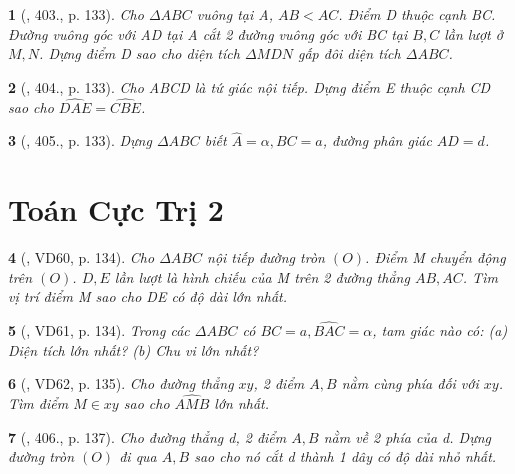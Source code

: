\documentclass{article}
\newtheorem{baitoan}{}
\begin{document}
\begin{baitoan}[\cite{Binh_Toan_9_tap_2}, 403., p. 133]
	Cho $\Delta ABC$ vuông tại A, $AB < AC$. Điểm D thuộc cạnh BC. Đường vuông góc với AD tại A cắt 2 đường vuông góc với BC tại $B,C$ lần lượt ở $M,N$. Dựng điểm D sao cho diện tích $\Delta MDN$ gấp đôi diện tích $\Delta ABC$.
\end{baitoan}

\begin{baitoan}[\cite{Binh_Toan_9_tap_2}, 404., p. 133]
	Cho ABCD là tứ giác nội tiếp. Dựng điểm E thuộc cạnh CD sao cho $\widehat{DAE} = \widehat{CBE}$.
\end{baitoan}

\begin{baitoan}[\cite{Binh_Toan_9_tap_2}, 405., p. 133]
	Dựng $\Delta ABC$ biết $\widehat{A} = \alpha,BC = a$, đường phân giác $AD = d$.
\end{baitoan}


\section{Toán Cực Trị 2}

\begin{baitoan}[\cite{Binh_Toan_9_tap_2}, VD60, p. 134]
	Cho $\Delta ABC$ nội tiếp đường tròn $(O)$. Điểm M chuyển động trên $(O)$. $D,E$ lần lượt là hình chiếu của M trên 2 đường thẳng $AB,AC$. Tìm vị trí điểm M sao cho DE có độ dài lớn nhất.
\end{baitoan}

\begin{baitoan}[\cite{Binh_Toan_9_tap_2}, VD61, p. 134]
	Trong các $\Delta ABC$ có $BC = a,\widehat{BAC} = \alpha$, tam giác nào có: (a) Diện tích lớn nhất? (b) Chu vi lớn nhất?
\end{baitoan}

\begin{baitoan}[\cite{Binh_Toan_9_tap_2}, VD62, p. 135]
	Cho đường thẳng $xy$, 2 điểm $A,B$ nằm cùng phía đối với $xy$. Tìm điểm $M\in xy$ sao cho $\widehat{AMB}$ lớn nhất.
\end{baitoan}

\begin{baitoan}[\cite{Binh_Toan_9_tap_2}, 406., p. 137]
	Cho đường thẳng d, 2 điểm $A,B$ nằm về 2 phía của d. Dựng đường tròn $(O)$ đi qua $A,B$ sao cho nó cắt d thành 1 dây có độ dài nhỏ nhất.
\end{baitoan}
\end{document}
